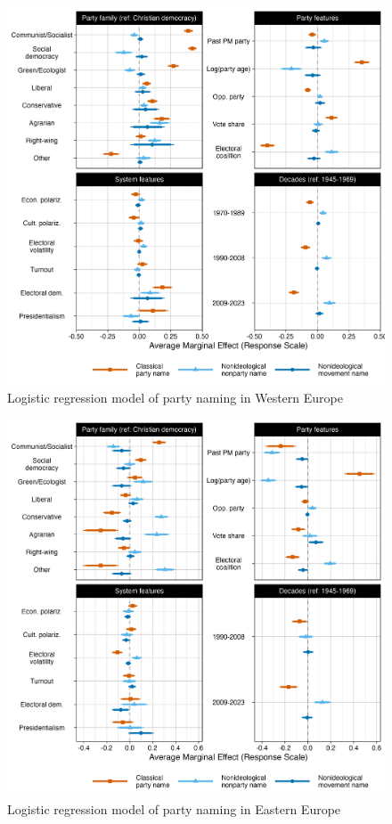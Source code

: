 \documentclass[12pt]{article}
\begin{document}
\begin{figure}[H]
\includegraphics[width=\textwidth]{./Figures/Figure5_west.png}
\caption{Logistic regression model of party naming in Western Europe}
\end{figure}

\newpage

\begin{figure}[H]
\includegraphics[width=\textwidth]{./Figures/Figure5_east.png}
\caption{Logistic regression model of party naming in Eastern Europe}
\end{figure}
\end{document}
